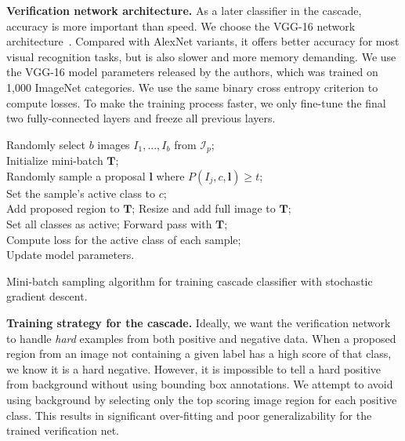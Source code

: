 \documentclass[10pt,twocolumn,letterpaper]{article}
\begin{document}
\textbf{Verification network architecture.} As a later classifier in the cascade, accuracy is more important than speed. We choose the VGG-16 network architecture~\cite{Simonyan14c}. Compared with AlexNet variants, it offers better accuracy for most visual recognition tasks, but is also slower and more memory demanding. We use the VGG-16 model parameters released by the authors, which was trained on 1,000 ImageNet categories. We use the same binary cross entropy criterion to compute losses. To make the training process faster, we only fine-tune the final two fully-connected layers and freeze all previous layers.

\begin{algorithm}
    {
      Randomly select $b$ images $I_1,...,I_b$ from $\mathcal{I}_p$;\\
      Initialize mini-batch $\mathbf{T}$;\\
      {
         {
         Randomly sample a proposal $\mathbf{l}$ where $P(I_j, c, \mathbf{l})\ge t$;\\
         Set the sample's active class to $c$;\\
         Add proposed region to $\mathbf{T}$;
         }
         \Else
         {
         Resize and add full image to $\mathbf{T}$;\\
         Set all classes as active;
         }
      }
      Forward pass with $\mathbf{T}$;\\
      Compute loss for the active class of each sample;\\
      Update model parameters.\\
    }
\caption{Mini-batch sampling algorithm for training cascade classifier with stochastic gradient descent.}
\label{alg:sample}
\end{algorithm}

\textbf{Training strategy for the cascade.} Ideally, we want the verification network to handle \textit{hard} examples from both positive and negative data. When a proposed region from an image not containing a given label has a high score of that class, we know it is a hard negative. However, it is impossible to tell a hard positive from background without using bounding box annotations. We attempt to avoid using background by selecting only the top scoring image region for each positive class. This results in significant over-fitting and poor generalizability for the trained verification net. 
\end{document}
